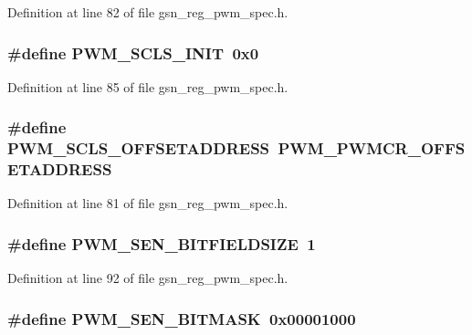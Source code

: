 Definition at line 82 of file gsn\_\-reg\_\-pwm\_\-spec.h.

\hypertarget{a00565_a06b314cd436f167fc3081a845546b2cc}{
\subsubsection[{PWM\_\-SCLS\_\-INIT}]{\setlength{\rightskip}{0pt plus 5cm}\#define PWM\_\-SCLS\_\-INIT~0x0}}
\label{a00565_a06b314cd436f167fc3081a845546b2cc}


Definition at line 85 of file gsn\_\-reg\_\-pwm\_\-spec.h.

\hypertarget{a00565_a2aa37a1f58aae29ca5c21a3ed714d64c}{
\subsubsection[{PWM\_\-SCLS\_\-OFFSETADDRESS}]{\setlength{\rightskip}{0pt plus 5cm}\#define PWM\_\-SCLS\_\-OFFSETADDRESS~PWM\_\-PWMCR\_\-OFFSETADDRESS}}
\label{a00565_a2aa37a1f58aae29ca5c21a3ed714d64c}


Definition at line 81 of file gsn\_\-reg\_\-pwm\_\-spec.h.

\hypertarget{a00565_af0d8ffbf5f63bfcce2096cb6647e6008}{
\subsubsection[{PWM\_\-SEN\_\-BITFIELDSIZE}]{\setlength{\rightskip}{0pt plus 5cm}\#define PWM\_\-SEN\_\-BITFIELDSIZE~1}}
\label{a00565_af0d8ffbf5f63bfcce2096cb6647e6008}


Definition at line 92 of file gsn\_\-reg\_\-pwm\_\-spec.h.

\hypertarget{a00565_a1c3b561c85f49b7baf11499691b807f7}{
\subsubsection[{PWM\_\-SEN\_\-BITMASK}]{\setlength{\rightskip}{0pt plus 5cm}\#define PWM\_\-SEN\_\-BITMASK~0x00001000}}
\label{a00565_a1c3b561c85f49b7baf11499691b807f7}



